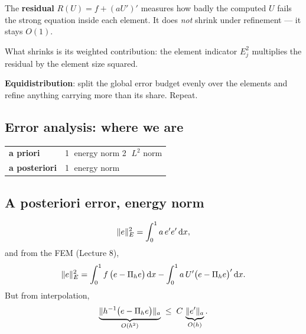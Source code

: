 
\begin{roadmap}[Lecture 9]
\begin{roadlist}
\item The \textbf{residual} $R(U)=f+(aU')'$ measures how badly the computed $U$
  fails the strong equation inside each element. It does \emph{not} shrink under
  refinement --- it stays $O(1)$.
\item What shrinks is its weighted contribution: the element indicator
  $E_j^{2}$ multiplies the residual by the element size squared.
\item \textbf{Equidistribution}: split the global error budget evenly over the
  elements and refine anything carrying more than its share. Repeat.
\end{roadlist}
\end{roadmap}

\subsection*{Error analysis: where we are}

\begin{center}\small
\renewcommand{\arraystretch}{1.2}
\begin{tabular}{@{}ll@{}}
\toprule
\textbf{a priori} & \textcircled{\scriptsize1} energy norm \quad
                    \textcircled{\scriptsize2} $L^{2}$ norm\\
\textbf{a posteriori} & \textcircled{\scriptsize1} energy norm\\
\bottomrule
\end{tabular}
\end{center}

\subsection*{A posteriori error, energy norm}

\begin{equation}\label{eq:l9enorm}
  \lVert e\rVert_{E}^{2}=\int_0^1 a\,e'e'\,\mathrm{d} x ,
\end{equation}
and from the FEM (Lecture 8),
\begin{equation}\label{eq:l9fem}
  \lVert e\rVert_{E}^{2}
   =\int_0^1 f\,\bigl(e-\Pi_h e\bigr)\,\mathrm{d} x
   -\int_0^1 a\,U'\bigl(e-\Pi_h e\bigr)'\,\mathrm{d} x .
\end{equation}
But from interpolation,
\begin{equation}\label{eq:l9interp}
  \underbrace{\lVert h^{-1}\bigl(e-\Pi_h e\bigr)\rVert_{a}}_{O(h^{2})}
  \;\le\;C\,\underbrace{\lVert e'\rVert_{a}}_{O(h)} .
\end{equation}

